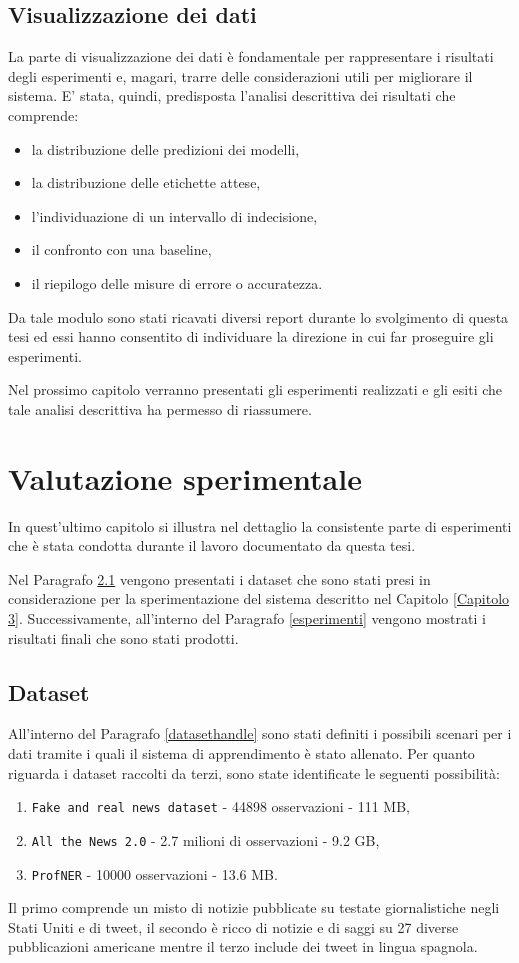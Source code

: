 \documentclass[12pt]{report}
\theoremstyle{definition}
\begin{document}
\section{Visualizzazione dei dati}\label{datavisualizationimpl}
La parte di visualizzazione dei dati è fondamentale per rappresentare i risultati degli esperimenti e, magari, trarre delle considerazioni utili per migliorare il sistema. E' stata, quindi, predisposta l'analisi descrittiva dei risultati che comprende:
\begin{itemize}
    \item la distribuzione delle predizioni dei modelli,
    \item la distribuzione delle etichette attese,
    \item l'individuazione di un intervallo di indecisione,
    \item il confronto con una baseline,
    \item il riepilogo delle misure di errore o accuratezza.
\end{itemize}
Da tale modulo sono stati ricavati diversi report durante lo svolgimento di questa tesi ed essi hanno consentito di individuare la direzione in cui far proseguire gli esperimenti.

Nel prossimo capitolo verranno presentati gli esperimenti realizzati e gli esiti che tale analisi descrittiva ha permesso di riassumere.

\chapter{Valutazione sperimentale}
\label{Capitolo 4}
\onehalfspacing
In quest'ultimo capitolo si illustra nel dettaglio la consistente parte di esperimenti che è stata condotta durante il lavoro documentato da questa tesi.

Nel Paragrafo \ref{dataset} vengono presentati i dataset che sono stati presi in considerazione per la sperimentazione del sistema descritto nel Capitolo \ref{Capitolo 3}. Successivamente, all'interno del Paragrafo \ref{esperimenti} vengono mostrati i risultati finali che sono stati prodotti.

\section{Dataset}\label{dataset}
All'interno del Paragrafo \ref{datasethandle} sono stati definiti i possibili scenari per i dati tramite i quali il sistema di apprendimento è stato allenato. Per quanto riguarda i dataset raccolti da terzi, sono state identificate le seguenti possibilità:
\begin{enumerate}
    \item \texttt{Fake and real news dataset} - 44898 osservazioni - 111 MB,
    \item \texttt{All the News 2.0} - 2.7 milioni di osservazioni - 9.2 GB,
    \item \texttt{ProfNER} - 10000 osservazioni - 13.6 MB.
\end{enumerate}
Il primo comprende un misto di notizie pubblicate su testate giornalistiche negli Stati Uniti e di tweet, il secondo è ricco di notizie e di saggi su 27 diverse pubblicazioni americane mentre il terzo include dei tweet in lingua spagnola.
\end{document}
